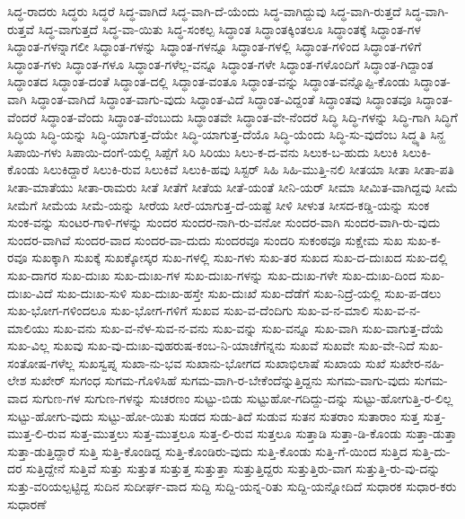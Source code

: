 {ಸಿದ್ಧ-ರಾದರು
ಸಿದ್ಧರು
ಸಿದ್ಧರೆ
ಸಿದ್ಧ-ವಾಗಿದೆ
ಸಿದ್ಧ-ವಾಗಿ-ದೆ-ಯೆಂದು
ಸಿದ್ಧ-ವಾಗಿದ್ದುವು
ಸಿದ್ಧ-ವಾಗಿ-ರುತ್ತದೆ
ಸಿದ್ಧ-ವಾಗಿ-ರುತ್ತವೆ
ಸಿದ್ಧ-ವಾಗುತ್ತದೆ
ಸಿದ್ಧ-ವಾ-ಯಿತು
ಸಿದ್ಧ-ಸಂಕಲ್ಪ
ಸಿದ್ಧಾಂತ
ಸಿದ್ಧಾಂತಕ್ಕಿಂತಲೂ
ಸಿದ್ಧಾಂತಕ್ಕೆ
ಸಿದ್ಧಾಂತ-ಗಳ
ಸಿದ್ಧಾಂತ-ಗಳನ್ನಾಗಲೀ
ಸಿದ್ಧಾಂತ-ಗಳನ್ನು
ಸಿದ್ಧಾಂತ-ಗಳನ್ನೂ
ಸಿದ್ಧಾಂತ-ಗಳಲ್ಲಿ
ಸಿದ್ಧಾಂತ-ಗಳಿಂದ
ಸಿದ್ಧಾಂತ-ಗಳಿಗೆ
ಸಿದ್ಧಾಂತ-ಗಳು
ಸಿದ್ಧಾಂತ-ಗಳೂ
ಸಿದ್ಧಾಂತ-ಗಳೆಲ್ಲ-ವನ್ನೂ
ಸಿದ್ಧಾಂತ-ಗಳೇ
ಸಿದ್ಧಾಂತ-ಗಳೊಂದಿಗೆ
ಸಿದ್ಧಾಂತ-ಗಿದ್ದಾಂತ
ಸಿದ್ಧಾಂತದ
ಸಿದ್ಧಾಂತ-ದಂತೆ
ಸಿದ್ಧಾಂತ-ದಲ್ಲಿ
ಸಿದ್ಧಾಂತ-ವಂತೂ
ಸಿದ್ಧಾಂತ-ವನ್ನು
ಸಿದ್ಧಾಂತ-ವನ್ನೊಪ್ಪಿ-ಕೊಂಡು
ಸಿದ್ಧಾಂತ-ವಾಗಿ
ಸಿದ್ಧಾಂತ-ವಾಗಿದೆ
ಸಿದ್ಧಾಂತ-ವಾಗು-ವುದು
ಸಿದ್ಧಾಂತ-ವಿದೆ
ಸಿದ್ಧಾಂತ-ವಿದ್ದಂತೆ
ಸಿದ್ಧಾಂತವು
ಸಿದ್ಧಾಂತವೂ
ಸಿದ್ಧಾಂತ-ವೆಂದರೆ
ಸಿದ್ಧಾಂತ-ವೆಂದು
ಸಿದ್ಧಾಂತ-ವೆಂಬುದು
ಸಿದ್ಧಾಂತವೇ
ಸಿದ್ಧಾಂತ-ವೇ-ನೆಂದರೆ
ಸಿದ್ಧಿ
ಸಿದ್ಧಿ-ಗಳನ್ನು
ಸಿದ್ಧಿ-ಗಾಗಿ
ಸಿದ್ಧಿಗೆ
ಸಿದ್ಧಿಯ
ಸಿದ್ಧಿ-ಯನ್ನು
ಸಿದ್ಧಿ-ಯಾಗುತ್ತ-ದೆಯೇ
ಸಿದ್ಧಿ-ಯಾಗುತ್ತ-ದೆಯೊ
ಸಿದ್ಧಿ-ಯೆಂದು
ಸಿದ್ಧಿ-ಸು-ವುದೆಂಬ
ಸಿದ್ಧ್ಯತಿ
ಸಿನ್ಹ
ಸಿಪಾಯಿ-ಗಳು
ಸಿಪಾಯಿ-ದಂಗೆ-ಯಲ್ಲಿ
ಸಿಪ್ಪೆಗೆ
ಸಿರಿ
ಸಿರಿಯು
ಸಿಲು-ಕ-ದ-ವನು
ಸಿಲುಕ-ಬ-ಹುದು
ಸಿಲುಕಿ
ಸಿಲುಕಿ-ಕೊಂಡು
ಸಿಲುಕಿದ್ದಾರೆ
ಸಿಲುಕಿ-ರುವ
ಸಿಲುಕಿವೆ
ಸಿಲುಕಿ-ಹವು
ಸಿಸ್ಟರ್
ಸಿಹಿ
ಸಿಹಿ-ಮುತ್ತಿ-ನಲಿ
ಸೀತಯಾ
ಸೀತಾ
ಸೀತಾ-ಪತಿ
ಸೀತಾ-ಮಾತೆಯು
ಸೀತಾ-ರಾಮರು
ಸೀತೆ
ಸೀತೆಗೆ
ಸೀತೆಯ
ಸೀತೆ-ಯಂತೆ
ಸೀನಿ-ಯರ್
ಸೀಮಾ
ಸೀಮಿತ-ವಾಗಿದ್ದವು
ಸೀಮೆ
ಸೀಮೆಗೆ
ಸೀಮೆಯ
ಸೀಮೆ-ಯನ್ನು
ಸೀರೆಯ
ಸೀರೆ-ಯಾಗುತ್ತ-ದೆ-ಯಷ್ಟೆ
ಸೀಳಿ
ಸೀಳುತ
ಸೀಸದ-ಕಡ್ಡಿ-ಯನ್ನು
ಸುಂಕ
ಸುಂಕ-ವನ್ನು
ಸುಂಟರ-ಗಾಳಿ-ಗಳನ್ನು
ಸುಂದರ
ಸುಂದರ-ನಾಗಿ-ರು-ವನೋ
ಸುಂದರ-ವಾಗಿ
ಸುಂದರ-ವಾಗಿ-ರು-ವುದು
ಸುಂದರ-ವಾಗಿವೆ
ಸುಂದರ-ವಾದ
ಸುಂದರ-ವಾ-ದುದು
ಸುಂದರವೂ
ಸುಂದರಿ
ಸುಕಂಠವೂ
ಸುಕ್ಷೇಮ
ಸುಖ
ಸುಖ-ಕ-ರವೂ
ಸುಖಕ್ಕಾಗಿ
ಸುಖಕ್ಕೆ
ಸುಖಕ್ಕೋಸ್ಕರ
ಸುಖ-ಗಳಲ್ಲಿ
ಸುಖ-ಗಳು
ಸುಖ-ತರ
ಸುಖದ
ಸುಖ-ದ-ದುಃಖದ
ಸುಖ-ದಲ್ಲಿ
ಸುಖ-ದಾಗರ
ಸುಖ-ದುಃಖ
ಸುಖ-ದುಃಖ-ಗಳ
ಸುಖ-ದುಃಖ-ಗಳನ್ನು
ಸುಖ-ದುಃಖ-ಗಳೇ
ಸುಖ-ದುಃಖ-ದಿಂದ
ಸುಖ-ದುಃಖ-ವಿದೆ
ಸುಖ-ದುಃಖ-ಸುಳಿ
ಸುಖ-ದುಃಖ-ಹಸ್ತೇ
ಸುಖ-ದುಃಖೆ
ಸುಖ-ದೆಡೆಗೆ
ಸುಖ-ನಿದ್ರೆ-ಯಲ್ಲಿ
ಸುಖ-ಪ-ಡಲು
ಸುಖ-ಭೋಗ-ಗಳಿಂದಲೂ
ಸುಖ-ಭೋಗ-ಗಳಿಗೆ
ಸುಖವ
ಸುಖ-ವ-ದೆಂದಿಗು
ಸುಖ-ವ-ನ-ಮಾಲಿ
ಸುಖ-ವ-ನ-ಮಾಲಿಯು
ಸುಖ-ವನು
ಸುಖ-ವ-ನೆಳ-ಸುವ-ನ-ವನು
ಸುಖ-ವನ್ನು
ಸುಖ-ವನ್ನೂ
ಸುಖ-ವಾಗಿ
ಸುಖ-ವಾಗುತ್ತ-ದೆಯೆ
ಸುಖ-ವಿಲ್ಲ
ಸುಖವು
ಸುಖ-ವು-ದುಃಖ-ವುಹರುಷ-ಕಂಬ-ನಿ-ಯಾಚೆಗೆನ್ನನು
ಸುಖವೆ
ಸುಖವೇ
ಸುಖ-ವೇ-ನಿದೆ
ಸುಖ-ಸಂತೋಷ-ಗಳೆಲ್ಲ
ಸುಖಸ್ವಪ್ನ
ಸುಖಾ-ನು-ಭವ
ಸುಖಾನು-ಭೋಗದ
ಸುಖಾಭಿಲಾಷೆ
ಸುಖಾಯ
ಸುಖೆ
ಸುಖೇರ-ನಹಿ-ಲೇಶ
ಸುಖೇರ್
ಸುಗಂಧ
ಸುಗಮ-ಗೊಳಿಸಿಹೆ
ಸುಗಮ-ವಾಗಿ-ರ-ಬೇಕೆಂದೆನ್ನುತ್ತಿದ್ದನು
ಸುಗಮ-ವಾಗು-ವುದು
ಸುಗಮ-ವಾದ
ಸುಗುಣ-ಗಳ
ಸುಗುಣ-ಗಳನ್ನು
ಸುಚರಣಂ
ಸುಟ್ಟು-ಬಿಡು
ಸುಟ್ಟುಹೋ-ಗದಿದ್ದು-ದನ್ನು
ಸುಟ್ಟು-ಹೋಗುತ್ತಿ-ರ-ಲಿಲ್ಲ
ಸುಟ್ಟು-ಹೋಗು-ವುದು
ಸುಟ್ಟು-ಹೋ-ಯಿತು
ಸುಡದ
ಸುಡು-ತಿದೆ
ಸುಡುವ
ಸುತನ
ಸುತರಾಂ
ಸುತಾರಾಂ
ಸುತ್ತ
ಸುತ್ತ-ಮುತ್ತ-ಲಿ-ರುವ
ಸುತ್ತ-ಮುತ್ತಲು
ಸುತ್ತ-ಮುತ್ತಲೂ
ಸುತ್ತ-ಲಿ-ರುವ
ಸುತ್ತಲೂ
ಸುತ್ತಾಡಿ
ಸುತ್ತಾ-ಡಿ-ಕೊಂಡು
ಸುತ್ತಾ-ಡುತ್ತಾ
ಸುತ್ತಾ-ಡುತ್ತಿದ್ದಾರೆ
ಸುತ್ತಿ
ಸುತ್ತಿ-ಕೊಂಡಿದ್ದ
ಸುತ್ತಿ-ಕೊಂಡಿರು-ವುದು
ಸುತ್ತಿ-ಕೊಂಡು
ಸುತ್ತಿ-ಗೆ-ಯಿಂದ
ಸುತ್ತಿದ
ಸುತ್ತಿ-ದು-ದರ
ಸುತ್ತಿದ್ದೇನೆ
ಸುತ್ತಿವೆ
ಸುತ್ತು
ಸುತ್ತುತ
ಸುತ್ತುತ್ತ
ಸುತ್ತುತ್ತಾ
ಸುತ್ತುತ್ತಿದ್ದರು
ಸುತ್ತುತ್ತಿರು-ವಾಗ
ಸುತ್ತುತ್ತಿ-ರು-ವು-ದನ್ನು
ಸುತ್ತು-ವರಿಯಲ್ಪಟ್ಟಿದ್ದ
ಸುದಿನ
ಸುದೀರ್ಘ-ವಾದ
ಸುದ್ದಿ
ಸುದ್ದಿ-ಯನ್ನ-ರಿತು
ಸುದ್ದಿ-ಯನ್ನೋದಿದೆ
ಸುಧಾರಕ
ಸುಧಾರ-ಕರು
ಸುಧಾರಣೆ
}
